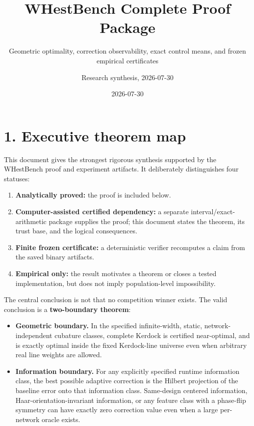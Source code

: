 \documentclass[
  10pt,
]{article}
\title{WHestBench Complete Proof Package}
\subtitle{Geometric optimality, correction observability, exact control
means, and frozen empirical certificates}
\author{Research synthesis, 2026-07-30}
\date{2026-07-30}
\providecommand{\tightlist}{%
  \setlength{\itemsep}{0pt}\setlength{\parskip}{0pt}}
\begin{document}
\maketitle

\section{1. Executive theorem map}\label{executive-theorem-map}

This document gives the strongest rigorous synthesis supported by the
WHestBench proof and experiment artifacts. It deliberately distinguishes
four statuses:

\begin{enumerate}
\def\labelenumi{\arabic{enumi}.}
\tightlist
\item
  \textbf{Analytically proved:} the proof is included below.
\item
  \textbf{Computer-assisted certified dependency:} a separate
  interval/exact-arithmetic package supplies the proof; this document
  states the theorem, its trust base, and the logical consequences.
\item
  \textbf{Finite frozen certificate:} a deterministic verifier
  recomputes a claim from the saved binary artifacts.
\item
  \textbf{Empirical only:} the result motivates a theorem or closes a
  tested implementation, but does not imply population-level
  impossibility.
\end{enumerate}

The central conclusion is not that no competition winner exists. The
valid conclusion is a \textbf{two-boundary theorem}:

\begin{itemize}
\tightlist
\item
  \textbf{Geometric boundary.} In the specified infinite-width, static,
  network-independent cubature classes, complete Kerdock is certified
  near-optimal, and is exactly optimal inside the fixed Kerdock-line
  universe even when arbitrary real line weights are allowed.
\item
  \textbf{Information boundary.} For any explicitly specified runtime
  information class, the best possible adaptive correction is the
  Hilbert projection of the baseline error onto that information class.
  Same-design centered information, Haar-orientation-invariant
  information, or any feature class with a phase-flip symmetry can have
  exactly zero correction value even when a large per-network oracle
  exists.
\end{itemize}
\end{document}
